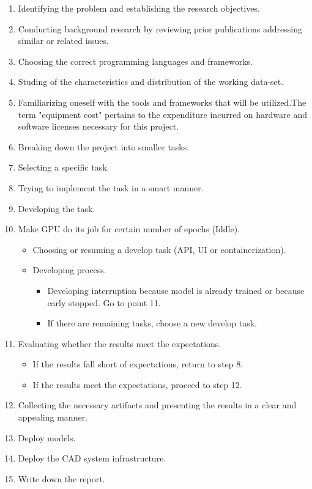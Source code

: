 \begin{enumerate}

  \item Identifying the problem and establishing the research objectives.
  \item Conducting background research by reviewing prior publications addressing similar or related issues.
  \item Choosing the correct programming languages and frameworks.
  \item Studing of the characteristics and distribution of the working data-set.
  \item Familiarizing oneself with the tools and frameworks that will be utilized.The term "equipment cost" pertains to the expenditure incurred on hardware and software licenses necessary for this project.
  \item Breaking down the project into smaller tasks.
  \item Selecting a specific task.
  \item Trying to implement the task in a smart manner.
  \item Developing the task.
  \item Make GPU do its job for certain number of epochs (Iddle).

    \begin{itemize}
      \item Choosing or resuming a develop task (API, UI or containerization).
      \item Developing process.
        \begin{itemize}
          \item Developing interruption because model is already trained or because early stopped. Go to point 11.
          \item If there are remaining tasks, choose a new develop task.
        \end{itemize}
    \end{itemize}


  \item Evaluating whether the results meet the expectations.

    \begin{itemize}
      \item If the results fall short of expectations, return to step 8.
      \item If the results meet the expectations, proceed to step 12.
    \end{itemize}

  \item Collecting the necessary artifacts and presenting the results in a clear and appealing manner.

  \item Deploy models.

  \item Deploy the CAD system infrastructure.

  \item Write down the report.

\end{enumerate}

